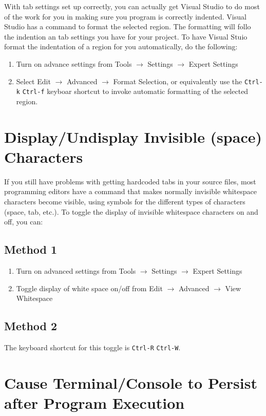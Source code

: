 \documentclass[11pt]{article}
\begin{document}
With tab settings set up correctly, you can actually get Visual Studio
to do most of the work for you in making sure you program is correctly
indented.  Visual Studio has a command to format the selected region.
The formatting will follo the indention an tab settings you have for
your project.  To have Visual Stuio format the indentation of a region
for you automatically, do the following:

\begin{enumerate}
\item Turn on advance settings from Tools $\rightarrow$ Settings
   $\rightarrow$ Expert Settings
\item Select Edit $\rightarrow$ Advanced $\rightarrow$ Format Selection,
   or equivalently use the \verb~Ctrl-k~ \verb~Ctrl-f~ keyboar shortcut to
   invoke automatic formatting of the selected region.
\end{enumerate}
\section{Display/Undisplay Invisible (space) Characters}
\label{sec-4}

If you still have problems with getting hardcoded tabs in your source
files, most programming editors have a command that makes normally
invisible whitespace characters become visible, using symbols for the
different types of characters (space, tab, etc.).  To toggle the
display of invisible whitespace characters on and off, you can:
\subsection{Method 1}
\label{sec-4-1}

\begin{enumerate}
\item Turn on advanced settings from Tools $\rightarrow$ Settings $\rightarrow$ Expert Settings
\item Toggle display of white space on/off from Edit $\rightarrow$ Advanced $\rightarrow$ View Whitespace
\end{enumerate}
\subsection{Method 2}
\label{sec-4-2}

The keyboard shortcut for this toggle is \verb~Ctrl-R~ \verb~Ctrl-W~.
\section{Cause Terminal/Console to Persist after Program Execution}
\label{sec-5}
\end{document}
